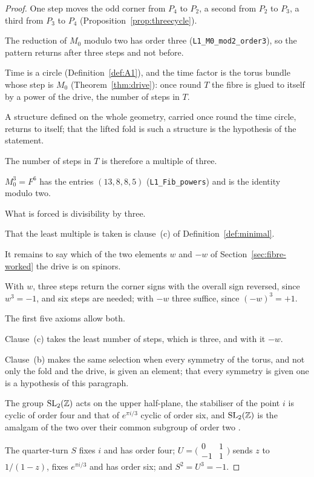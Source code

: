 \documentclass[11pt,a4paper]{article}
\theoremstyle{plain}
\theoremstyle{definition}
\theoremstyle{remark}
\begin{document}
\begin{proof}
One step moves the odd corner from $P_{4}$ to $P_{2}$, a second from $P_{2}$ to $P_{3}$, a third from $P_{3}$ to $P_{4}$ (Proposition~\ref{prop:threecycle}).

The reduction of $M_{0}$ modulo two has order three (\texttt{L1\_M0\_mod2\_order3}), so the pattern returns after three steps and not before.

Time is a circle (Definition~\ref{def:A1}), and the time factor is the torus bundle whose step is $M_{0}$ (Theorem~\ref{thm:drive}): once round $T$ the fibre is glued to itself by a power of the drive, the number of steps in $T$.

A structure defined on the whole geometry, carried once round the time circle, returns to itself; that the lifted fold is such a structure is the hypothesis of the statement.

The number of steps in $T$ is therefore a multiple of three.

$M_{0}^{3}=F^{6}$ has the entries $(13,8,8,5)$ (\texttt{L1\_Fib\_powers}) and is the identity modulo two.

What is forced is divisibility by three.

That the least multiple is taken is clause~(c) of Definition~\ref{def:minimal}.

It remains to say which of the two elements $w$ and $-w$ of Section~\ref{sec:fibre-worked} the drive is on spinors.

With $w$, three steps return the corner signs with the overall sign reversed, since $w^{3}=-1$, and six steps are needed; with $-w$ three suffice, since $(-w)^{3}=+1$.

The first five axioms allow both.

Clause~(c) takes the least number of steps, which is three, and with it $-w$.

Clause~(b) makes the same selection when every symmetry of the torus, and not only the fold and the drive, is given an element; that every symmetry is given one is a hypothesis of this paragraph.

The group $\mathrm{SL}_{2}(\mathbb{Z})$ acts on the upper half-plane, the stabiliser of the point $i$ is cyclic of order four and that of $e^{\pi i/3}$ cyclic of order six, and $\mathrm{SL}_{2}(\mathbb{Z})$ is the amalgam of the two over their common subgroup of order two \cite{Serre}.

The quarter-turn $S$ fixes $i$ and has order four; $U=\bigl(\begin{smallmatrix}0&1\\-1&1\end{smallmatrix}\bigr)$ sends $z$ to $1/(1-z)$, fixes $e^{\pi i/3}$ and has order six; and $S^{2}=U^{3}=-1$.


\end{proof}
\end{document}
